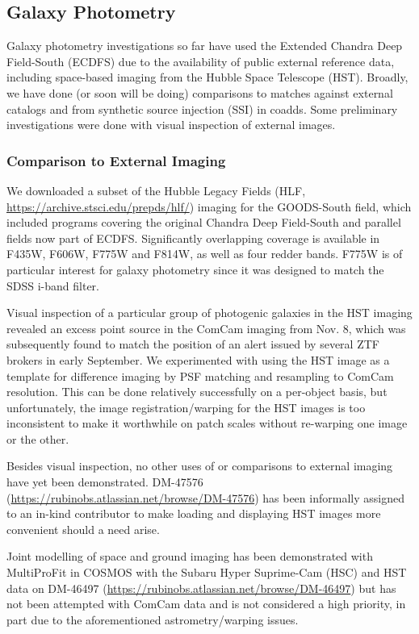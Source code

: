 \subsection{Galaxy Photometry}
\label{sec:galaxy_photometry}

Galaxy photometry investigations so far have used the Extended Chandra Deep Field-South (ECDFS) due to the availability of public external reference data, including space-based imaging from the Hubble Space Telescope (HST).
Broadly, we have done (or soon will be doing) comparisons to matches against external catalogs and from synthetic source injection (SSI) in coadds.
Some preliminary investigations were done with visual inspection of external images.

\subsubsection{Comparison to External Imaging}
\label{subsec:galaxy_photometry_external_imaging}

We downloaded a subset of the Hubble Legacy Fields (HLF, \url{https://archive.stsci.edu/prepds/hlf/}) imaging for the GOODS-South field, which included programs covering the original Chandra Deep Field-South and parallel fields now part of ECDFS.
Significantly overlapping coverage is available in F435W, F606W, F775W and F814W, as well as four redder bands.
F775W is of particular interest for galaxy photometry since it was designed to match the SDSS i-band filter.

Visual inspection of a particular group of photogenic galaxies in the HST imaging revealed an excess point source in the ComCam imaging from Nov. 8, which was subsequently found to match the position of an alert issued by several ZTF brokers in early September.
We experimented with using the HST image as a template for difference imaging by PSF matching and resampling to ComCam resolution.
This can be done relatively successfully on a per-object basis, but unfortunately, the image registration/warping for the HST images is too inconsistent to make it worthwhile on patch scales without re-warping one image or the other.

Besides visual inspection, no other uses of or comparisons to external imaging have yet been demonstrated.
DM-47576 (\url{https://rubinobs.atlassian.net/browse/DM-47576}) has been informally assigned to an in-kind contributor to make loading and displaying HST images more convenient should a need arise.

Joint modelling of space and ground imaging has been demonstrated with MultiProFit in COSMOS with the Subaru Hyper Suprime-Cam (HSC) and HST data on DM-46497 (\url{https://rubinobs.atlassian.net/browse/DM-46497}) but has not been attempted with ComCam data and is not considered a high priority, in part due to the aforementioned astrometry/warping issues.

